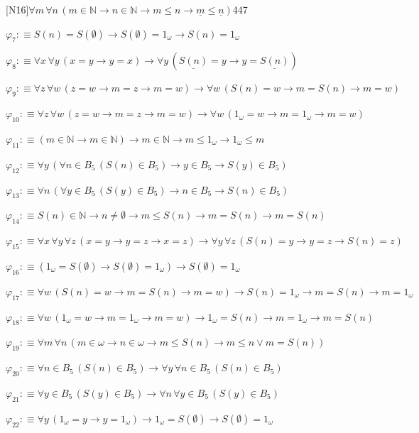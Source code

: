 \begin{fullproof}{[N16]}{$\forall m\,\forall n\,(m \in \mathbb{N} \to n \in \mathbb{N} \to m \leq n \to \underline{m} \leq \underline{n})$}{447}
\begin{abbrevlist}
\item $\varphi_{7} :\equiv S(n) = S(\emptyset) \to S(\emptyset) = 1_{\omega} \to S(n) = 1_{\omega}$
\item $\varphi_{8} :\equiv \forall x\,\forall y\,(x = y \to y = x) \to \forall y\,(\underline{S(n)} = y \to y = \underline{S(n)})$
\item $\varphi_{9} :\equiv \forall z\,\forall w\,(z = w \to m = z \to m = w) \to \forall w\,(S(n) = w \to m = S(n) \to m = w)$
\item $\varphi_{10} :\equiv \forall z\,\forall w\,(z = w \to m = z \to m = w) \to \forall w\,(1_{\omega} = w \to m = 1_{\omega} \to m = w)$
\item $\varphi_{11} :\equiv (m \in \mathbb{N} \to m \in \mathbb{N}) \to m \in \mathbb{N} \to m \leq 1_{\omega} \to 1_{\omega} \leq m$
\item $\varphi_{12} :\equiv \forall y\,(\forall n \in B_{5}\,(S(n) \in B_{5}) \to y \in B_{5} \to S(y) \in B_{5})$
\item $\varphi_{13} :\equiv \forall n\,(\forall y \in B_{5}\,(S(y) \in B_{5}) \to n \in B_{5} \to S(n) \in B_{5})$
\item $\varphi_{14} :\equiv S(n) \in \mathbb{N} \to n \neq \emptyset \to m \leq S(n) \to m = S(n) \to m = S(n)$
\item $\varphi_{15} :\equiv \forall x\,\forall y\,\forall z\,(x = y \to y = z \to x = z) \to \forall y\,\forall z\,(S(n) = y \to y = z \to S(n) = z)$
\item $\varphi_{16} :\equiv (1_{\omega} = S(\emptyset) \to S(\emptyset) = 1_{\omega}) \to S(\emptyset) = 1_{\omega}$
\item $\varphi_{17} :\equiv \forall w\,(S(n) = w \to m = S(n) \to m = w) \to S(n) = 1_{\omega} \to m = S(n) \to m = 1_{\omega}$
\item $\varphi_{18} :\equiv \forall w\,(1_{\omega} = w \to m = 1_{\omega} \to m = w) \to 1_{\omega} = S(n) \to m = 1_{\omega} \to m = S(n)$
\item $\varphi_{19} :\equiv \forall m\,\forall n\,(m \in \omega \to n \in \omega \to m \leq S(n) \to m \leq n \lor m = S(n))$
\item $\varphi_{20} :\equiv \forall n \in B_{5}\,(S(n) \in B_{5}) \to \forall y\,\forall n \in B_{5}\,(S(n) \in B_{5})$
\item $\varphi_{21} :\equiv \forall y \in B_{5}\,(S(y) \in B_{5}) \to \forall n\,\forall y \in B_{5}\,(S(y) \in B_{5})$
\item $\varphi_{22} :\equiv \forall y\,(1_{\omega} = y \to y = 1_{\omega}) \to 1_{\omega} = S(\emptyset) \to S(\emptyset) = 1_{\omega}$

\end{abbrevlist}
\end{fullproof}

